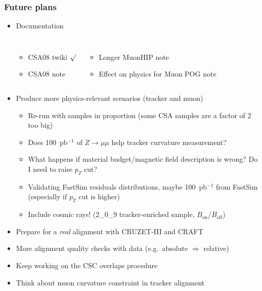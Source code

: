 \documentclass[compress]{beamer}
\begin{document}
\begin{frame}
\frametitle{Future plans}
\small

\begin{itemize}
\item Documentation

\vspace{-0.1 cm}
\begin{columns}
\begin{itemize}\setlength{\itemsep}{-0.05 cm}
\item CSA08 twiki $\surd$
\item CSA08 note
\end{itemize}
\begin{itemize}\setlength{\itemsep}{-0.05 cm}
\item Longer MuonHIP note
\item Effect on physics for Muon POG note
\end{itemize}
\end{columns}
\item Produce more physics-relevant scenarios (tracker and muon)
\begin{itemize}
\item Re-run with samples in proportion (some CSA samples are a factor of 2 too big)
\item Does 100~pb$^{-1}$ of $Z\to\mu\mu$ help tracker curvature measurement?
\item What happens if material budget/magnetic field description is wrong?  Do I need to raise $p_T$ cut?
\item Validating FastSim residuals distributions, maybe 100~pb$^{-1}$
from FastSim (especially if $p_T$ cut is higher)
\item Include cosmic rays!  (2\_0\_9 tracker-enriched sample, \mbox{$B_{\mbox{on}}$/$B_{\mbox{off}}$)\hspace{-1 cm}}
\end{itemize}
\item Prepare for a {\it real} alignment with CRUZET-III and CRAFT
\item More alignment quality checks with data (e.g.\ absolute $\Rightarrow$ relative)
\item Keep working on the CSC overlaps procedure
\item Think about muon curvature constraint in tracker alignment
\end{itemize}

\label{numpages}
\end{frame}
\end{document}
